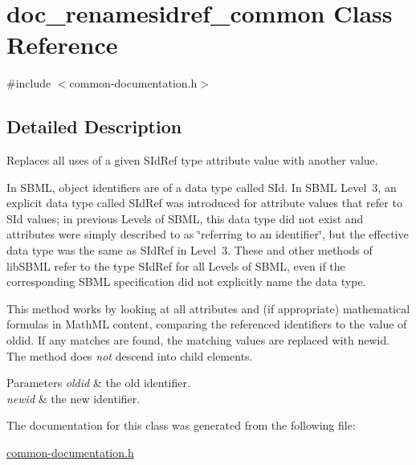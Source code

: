 \hypertarget{classdoc__renamesidref__common}{}\section{doc\+\_\+renamesidref\+\_\+common Class Reference}
\label{classdoc__renamesidref__common}


{\ttfamily \#include $<$common-\/documentation.\+h$>$}



\subsection{Detailed Description}
Replaces all uses of a given {\ttfamily S\+Id\+Ref} type attribute value with another value.

\begin{DoxyParagraph}{}

\end{DoxyParagraph}
In S\+B\+ML, object identifiers are of a data type called {\ttfamily S\+Id}. In S\+B\+ML Level~3, an explicit data type called {\ttfamily S\+Id\+Ref} was introduced for attribute values that refer to {\ttfamily S\+Id} values; in previous Levels of S\+B\+ML, this data type did not exist and attributes were simply described to as \char`\"{}referring to an identifier\char`\"{}, but the effective data type was the same as {\ttfamily S\+Id\+Ref} in Level~3. These and other methods of lib\+S\+B\+ML refer to the type {\ttfamily S\+Id\+Ref} for all Levels of S\+B\+ML, even if the corresponding S\+B\+ML specification did not explicitly name the data type.

This method works by looking at all attributes and (if appropriate) mathematical formulas in Math\+ML content, comparing the referenced identifiers to the value of {\ttfamily oldid}. If any matches are found, the matching values are replaced with {\ttfamily newid}. The method does {\itshape not} descend into child elements.


\begin{DoxyParams}{Parameters}
{\em oldid} & the old identifier. \\
\hline
{\em newid} & the new identifier. \\
\hline
\end{DoxyParams}


The documentation for this class was generated from the following file\+:\begin{DoxyCompactItemize}
\item 
\hyperlink{common-documentation_8h}{common-\/documentation.\+h}\end{DoxyCompactItemize}
